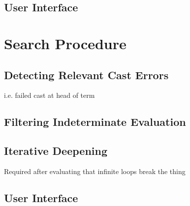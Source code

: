 \subsection{User Interface}


\section{Search Procedure}\label{sec:SearchProcedure}
\subsection{Detecting Relevant Cast Errors}
i.e. failed cast at head of term
\subsection{Filtering Indeterminate Evaluation}

\subsection{Iterative Deepening}\label{sec:IterativeDeepening}
Required after evaluating that infinite loops break the thing
\subsection{User Interface}


